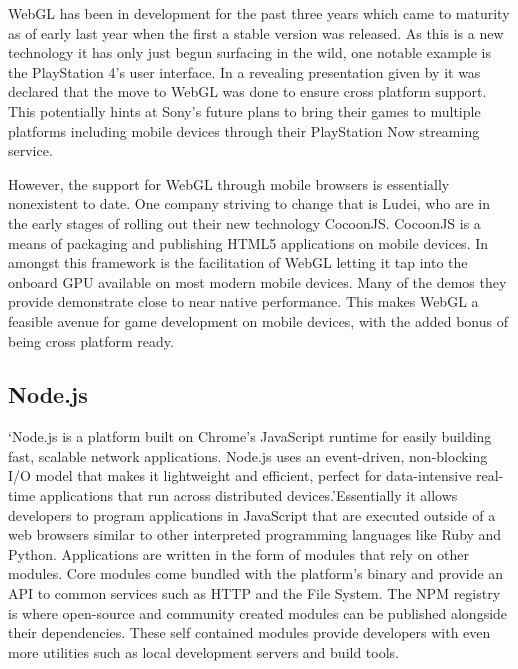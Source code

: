 \documentclass[final]{cmpreport}
\begin{document}
WebGL has been in development for the past three years which came to maturity as of early last year when the first a stable version was released. As this is a new technology it has only just begun surfacing in the wild, one notable example is the PlayStation 4's user interface. In a revealing presentation given by \cite{Olmstead} it was declared that the move to WebGL was done to ensure cross platform support. This potentially hints at Sony's future plans to bring their games to multiple platforms including mobile devices through their PlayStation Now streaming service.

However, the support for WebGL through mobile browsers is essentially nonexistent to date. One company striving to change that is Ludei, who are in the early stages of rolling out their new technology CocoonJS. CocoonJS is a means of packaging and publishing HTML5 applications on mobile devices. In amongst this framework is the facilitation of WebGL letting it tap into the onboard GPU available on most modern mobile devices. Many of the demos they provide demonstrate close to near native performance. This makes WebGL a feasible avenue for game development on mobile devices, with the added bonus of being cross platform ready.

\subsection{Node.js}
`Node.js is a platform built on Chrome's JavaScript runtime for easily building fast, scalable network applications. Node.js uses an event-driven, non-blocking I/O model that makes it lightweight and efficient, perfect for data-intensive real-time applications that run across distributed devices.'\footnotemark Essentially it allows developers to program applications in JavaScript that are executed outside of a web browsers similar to other interpreted programming languages like Ruby and Python. Applications are written in the form of modules that rely on other modules. Core modules come bundled with the platform's binary and provide an API to common services such as HTTP and the File System. The NPM registry is where open-source and community created modules can be published alongside their dependencies. These self contained modules provide developers with even more utilities such as local development servers and build tools.

\end{document}
